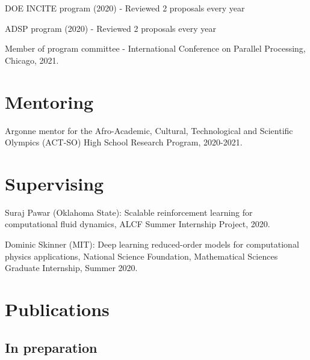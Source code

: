 \documentclass[letterpaper]{article}
\renewenvironment{itemize}{
  \begin{list}{}{
    \setlength{\leftmargin}{1.5em}
  }
}{
  \end{list}
}
\begin{document}
\begin{itemize}
\item DOE INCITE program (2020) - Reviewed 2 proposals every year
\item ADSP program (2020) - Reviewed 2 proposals every year
\item Member of program committee - International Conference on Parallel Processing, Chicago, 2021.
\end{itemize}

\section*{Mentoring}

\begin{itemize}
\item Argonne mentor for the Afro-Academic, Cultural, Technological and Scientific Olympics (ACT-SO) High School Research Program, 2020-2021.
\end{itemize}

\section*{Supervising}

\begin{itemize}
  \item Suraj Pawar (Oklahoma State): Scalable reinforcement learning for computational fluid dynamics, ALCF Summer Internship Project, 2020.

  \item Dominic Skinner (MIT): Deep learning reduced-order models for computational physics applications, National Science Foundation, Mathematical Sciences Graduate Internship, Summer 2020.
\end{itemize}


\section*{Publications}

\subsection*{In preparation}
\end{document}
